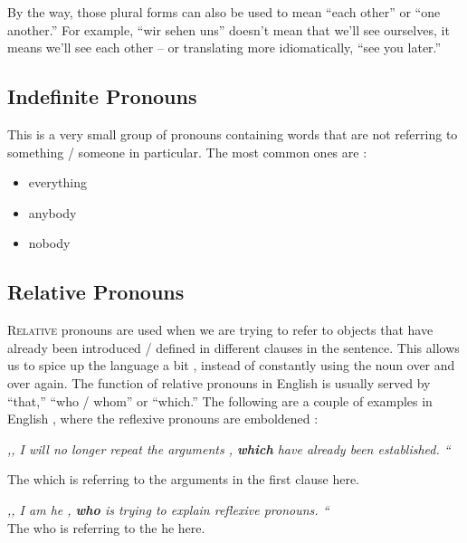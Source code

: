 \documentclass[a4paper,twocolumn,10pt]{article}
\newcommand{\newpar}
{\par \vspace{0.3cm}}
\newcommand{\subsectionend}
{
\nolinenumbers
\linenumbers
}
\begin{document}
		By the way, those plural forms can also be used to mean “each other” or
		“one another.” For example, “wir sehen uns” doesn’t mean that we'll see
		ourselves, it means we’ll see each other – or translating more
		idiomatically, “see you later.”

\subsectionend

\subsection{Indefinite Pronouns}
\label{ssec:indefinite_pronouns}

This is a very small group of pronouns containing words that are not referring
to something / someone in particular. The most common ones are :



\begin{itemize}[noitemsep]
	\item everything 
	\item anybody
	\item nobody
\end{itemize}



\subsectionend

\subsection{Relative Pronouns}
\label{ssec:relative_pronouns}

\lettrine[lines=3, findent=3pt, nindent=0pt]{R}{elative} pronouns are used when
we are trying to refer to objects that have already been introduced / defined in
different clauses in the sentence. This allows us to spice up the language a bit
, instead of constantly using the noun over and over again. The function of
relative pronouns in English is usually served by “that,” “who / whom” or
“which.” The following are a couple of examples in English , where the reflexive
pronouns are emboldened :\newpar

\textit{,, I will no longer repeat the arguments , \textbf{which} have already
	been established. ``}
\newpar
The which is referring to the arguments in the first clause here.\newpar

\textit{,, I am he , \textbf{who} is trying to explain reflexive pronouns. ``}\\
The who is referring to the he here.\newpar
\end{document}
